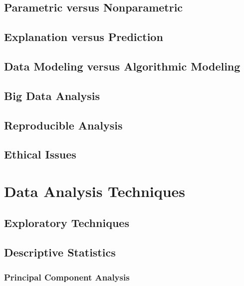 \documentclass[]{book}
\theoremstyle{definition}
\theoremstyle{definition}
\theoremstyle{definition}
\theoremstyle{remark}
\begin{document}
\subsection{Parametric versus
Nonparametric}\label{parametric-versus-nonparametric}

\subsection{Explanation versus Prediction}\label{S:expred}

\subsection{Data Modeling versus Algorithmic
Modeling}\label{data-modeling-versus-algorithmic-modeling}

\subsection{Big Data Analysis}\label{big-data-analysis}

\subsection{Reproducible Analysis}\label{reproducible-analysis}

\subsection{Ethical Issues}\label{ethical-issues}

\section{Data Analysis Techniques}\label{data-analysis-techniques}

\subsection{Exploratory Techniques}\label{exploratory-techniques}

\subsection{Descriptive Statistics}\label{descriptive-statistics}

\subsubsection{Principal Component
Analysis}\label{principal-component-analysis}
\end{document}
